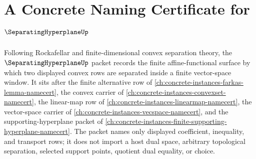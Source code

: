 \chapter{A Concrete Naming Certificate for $\SeparatingHyperplaneUp$}
\label{ch:concrete-instances-separating-hyperplane-namecert}

Following Rockafellar and finite-dimensional convex separation theory, the $\SeparatingHyperplaneUp$ packet records the finite affine-functional surface by which two displayed convex rows are separated inside a finite vector-space window. It sits after the finite alternative row of \autoref{ch:concrete-instances-farkas-lemma-namecert}, the convex carrier of \autoref{ch:concrete-instances-convexset-namecert}, the linear-map row of \autoref{ch:concrete-instances-linearmap-namecert}, the vector-space carrier of \autoref{ch:concrete-instances-vecspace-namecert}, and the supporting-hyperplane packet of \autoref{ch:concrete-instances-finite-supporting-hyperplane-namecert}. The packet names only displayed coefficient, inequality, and transport rows; it does not import a host dual space, arbitrary topological separation, selected support points, quotient dual equality, or choice.

